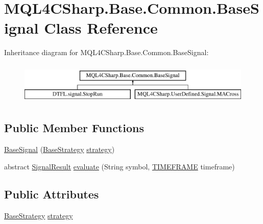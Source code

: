 \hypertarget{class_m_q_l4_c_sharp_1_1_base_1_1_common_1_1_base_signal}{}\section{M\+Q\+L4\+C\+Sharp.\+Base.\+Common.\+Base\+Signal Class Reference}
\label{class_m_q_l4_c_sharp_1_1_base_1_1_common_1_1_base_signal}
Inheritance diagram for M\+Q\+L4\+C\+Sharp.\+Base.\+Common.\+Base\+Signal\+:\begin{figure}[H]
\begin{center}
\leavevmode
\includegraphics[height=2.000000cm]{class_m_q_l4_c_sharp_1_1_base_1_1_common_1_1_base_signal}
\end{center}
\end{figure}
\subsection*{Public Member Functions}
\begin{DoxyCompactItemize}
\item 
\hyperlink{class_m_q_l4_c_sharp_1_1_base_1_1_common_1_1_base_signal_a9022328ee0627ab025b5c565b9c4e991}{Base\+Signal} (\hyperlink{class_m_q_l4_c_sharp_1_1_base_1_1_base_strategy}{Base\+Strategy} \hyperlink{class_m_q_l4_c_sharp_1_1_base_1_1_common_1_1_base_signal_adc5fd0efe0218a05bd5b0fb84c0d3814}{strategy})
\item 
abstract \hyperlink{class_m_q_l4_c_sharp_1_1_base_1_1_common_1_1_signal_result}{Signal\+Result} \hyperlink{class_m_q_l4_c_sharp_1_1_base_1_1_common_1_1_base_signal_ae7fcca9b3f96b7a51bebbceb89114389}{evaluate} (String symbol, \hyperlink{namespace_m_q_l4_c_sharp_1_1_base_1_1_enums_a838810aaa87c63c12737408dba8c0b35}{T\+I\+M\+E\+F\+R\+A\+ME} timeframe)
\end{DoxyCompactItemize}
\subsection*{Public Attributes}
\begin{DoxyCompactItemize}
\item 
\hyperlink{class_m_q_l4_c_sharp_1_1_base_1_1_base_strategy}{Base\+Strategy} \hyperlink{class_m_q_l4_c_sharp_1_1_base_1_1_common_1_1_base_signal_adc5fd0efe0218a05bd5b0fb84c0d3814}{strategy}
\end{DoxyCompactItemize}


